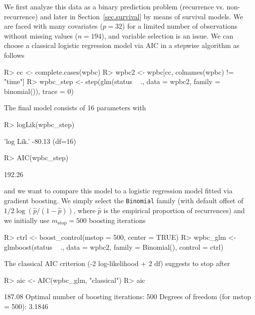 \documentclass{article}
\newcommand{\Robject}[1]{\texttt{#1}}
\newcommand{\df}{\mbox{df}}
\newenvironment{Schunk}{}{}
\begin{document}
We first analyze this data as a binary prediction problem 
(recurrence vs. non-recurrence) and later in Section~\ref{sec.survival} 
by means of survival models. We are faced with many covariates ($p = 32$) 
for a limited number of observations without missing values 
($n = 194$), and variable selection is an issue. We can choose a classical logistic regression model 
via AIC in a stepwise algorithm as follows 
\begin{Schunk}
\begin{Sinput}
R> cc <- complete.cases(wpbc)
R> wpbc2 <- wpbc[cc, colnames(wpbc) != "time"]
R> wpbc_step <- step(glm(status ~ ., data = wpbc2, 
         family = binomial()), trace = 0)
\end{Sinput}
\end{Schunk}
The final model consists of 16 parameters with
\begin{Schunk}
\begin{Sinput}
R> logLik(wpbc_step)
\end{Sinput}
\begin{Soutput}
'log Lik.' -80.13 (df=16)
\end{Soutput}
\begin{Sinput}
R> AIC(wpbc_step)
\end{Sinput}
\begin{Soutput}
[1] 192.26
\end{Soutput}
\end{Schunk}
and we want to compare this model to a logistic regression model fitted via gradient boosting. 
We simply select the \Robject{Binomial} family (with default offset of $1/2
\log(\hat{p} / (1 - \hat{p}))$,  
where $\hat{p}$ is the empirical proportion of recurrences) and we
initially use
$m_\text{stop} = 500$ boosting iterations 
\begin{Schunk}
\begin{Sinput}
R> ctrl <- boost_control(mstop = 500, center = TRUE)
R> wpbc_glm <- glmboost(status ~ ., data = wpbc2, 
         family = Binomial(), control = ctrl)
\end{Sinput}
\end{Schunk}
The classical AIC criterion (-2 log-likelihood + 2 $\df$) suggests to stop after
\begin{Schunk}
\begin{Sinput}
R> aic <- AIC(wpbc_glm, "classical")
R> aic
\end{Sinput}
\begin{Soutput}
[1] 187.08
Optimal number of boosting iterations: 500 
Degrees of freedom (for mstop = 500): 3.1846 
\end{Soutput}
\end{Schunk}
\end{document}
